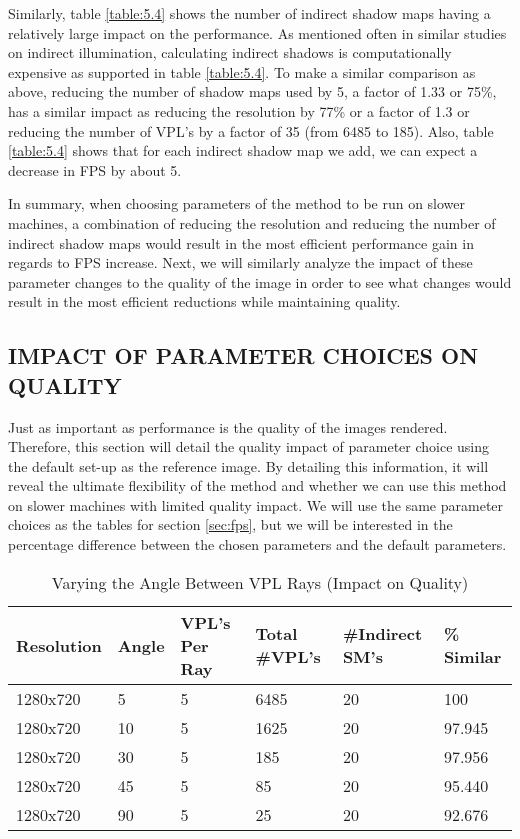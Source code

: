 Similarly, table \ref{table:5.4} shows the number of indirect shadow maps having a relatively large impact on the performance.  As mentioned often in similar studies on indirect illumination, calculating indirect shadows is computationally expensive as supported in table \ref{table:5.4}.  To make a similar comparison as above, reducing the number of shadow maps used by 5, a factor of 1.33 or 75\%, has a similar impact as reducing the resolution by 77\% or a factor of 1.3 or reducing the number of VPL's by a factor of 35 (from 6485 to 185).  Also, table \ref{table:5.4} shows that for each indirect shadow map we add, we can expect a decrease in FPS by about 5.

In summary, when choosing parameters of the method to be run on slower machines, a combination of reducing the resolution and reducing the number of indirect shadow maps would result in the most efficient performance gain in regards to FPS increase.  Next, we will similarly analyze the impact of these parameter changes to the quality of the image in order to see what changes would result in the most efficient reductions while maintaining quality.

\subsection{IMPACT OF PARAMETER CHOICES ON QUALITY} \label{sec:quality}
Just as important as performance is the quality of the images rendered.  Therefore, this section will detail the quality impact of parameter choice using the default set-up as the reference image.  By detailing this information, it will reveal the ultimate flexibility of the method and whether we can use this method on slower machines with limited quality impact.  We will use the same parameter choices as the tables for section \ref{sec:fps}, but we will be interested in the percentage difference between the chosen parameters and the default parameters.

\begin{table}[h!]
	\caption{Varying the Angle Between VPL Rays (Impact on Quality)}
	\begin{center}
	    \begin{tabular}{ | l | l | l | l | l | l |}
	    \hline
	    Resolution & Angle & VPL's Per Ray & Total \#VPL's & \#Indirect SM's & \% Similar\\ \hline
	    1280x720 & 5 & 5 & 6485 & 20 & 100\\ \hline
	    1280x720 & 10 & 5 & 1625 & 20 & 97.945\\ \hline
	    1280x720 & 30 & 5 & 185 & 20 & 97.956\\ \hline
	    1280x720 & 45 & 5 & 85 & 20 & 95.440\\ \hline
	    1280x720 & 90 & 5 & 25 & 20 & 92.676\\ \hline
	    \end{tabular}
	\end{center}
	\label{table:5.5}
\end{table}

